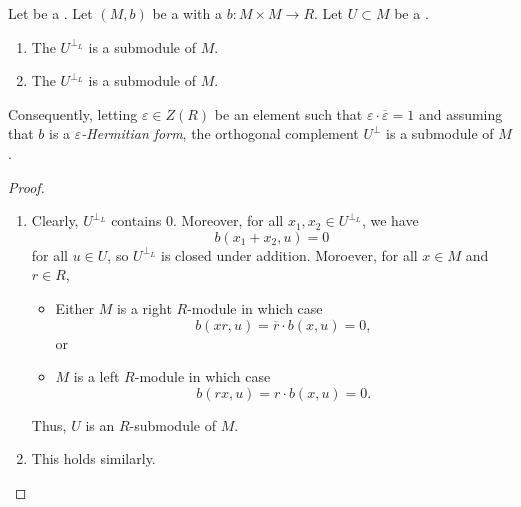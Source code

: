 \begin{lemma} \label{lemma:left_right_orthogonal_complement_of_a_submodule_of_a_module_with_a_sesquilinear_form_is_a_submodule}
    Let  be a . Let $(M,b)$ be a  with a  $b: M \times M \to R$. Let $U \subset M$ be a .
    \begin{enumerate}
        \item The  $U^{\perp_L}$ is a submodule of $M$.
        \item The  $U^{\perp_L}$ is a submodule of $M$.
    \end{enumerate}
    Consequently, letting $\varepsilon \in Z(R)$ be an element such that $\varepsilon \cdot \overline{\varepsilon} = 1$ and assuming that $b$ is a \textsl{$\varepsilon$-Hermitian form}, the orthogonal complement $U^{\perp}$ is a submodule of $M$.
\end{lemma}
\begin{proof}
    \begin{enumerate}
        \item Clearly, $U^{\perp_L}$ contains $0$. Moreover, for all $x_1,x_2 \in U^{\perp_L}$, we have 
        $$b(x_1+x_2,u) = 0$$
        for all $u \in U$, so $U^{\perp_L}$ is closed under addition. Moroever, for all $x \in M$ and $r \in R$, 
        \begin{itemize}
            \item Either $M$ is a right $R$-module in which case 
            $$b(xr, u) = \overline{r} \cdot b(x,u) = 0,$$
            or
            \item $M$ is a left $R$-module in which case 
            $$b(rx, u) = r \cdot b(x,u) = 0.$$
        \end{itemize}
        Thus, $U$ is an $R$-submodule of $M$.

        \item This holds similarly.
    \end{enumerate}
\end{proof}